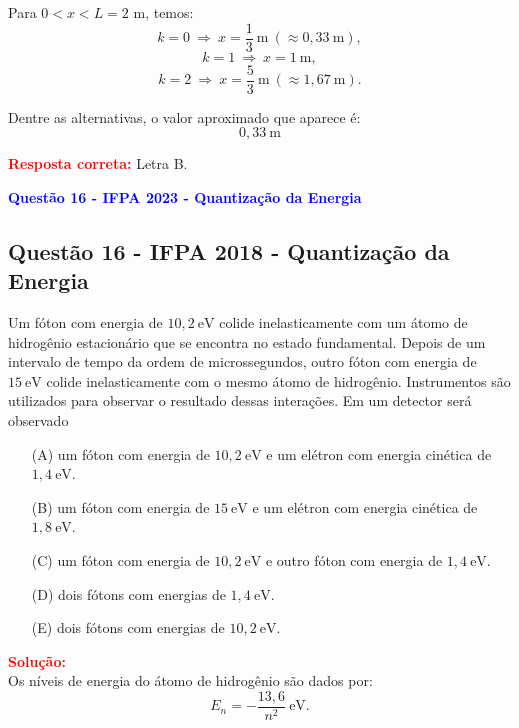 \begin{flushleft}
Para $0 < x < L = 2$ m, temos:
\[
k = 0 \ \Rightarrow \ x = \frac{1}{3} \ \text{m} \ (\approx 0,33 \ \text{m}),
\]
\[
k = 1 \ \Rightarrow \ x = 1 \ \text{m},
\]
\[
k = 2 \ \Rightarrow \ x = \frac{5}{3} \ \text{m} \ (\approx 1,67 \ \text{m}).
\]

Dentre as alternativas, o valor aproximado que aparece é:
\[
\boxed{0,33 \ \text{m}}
\]

\textcolor{red}{\textbf{Resposta correta:}} Letra B.

\end{flushleft}

\begin{flushleft}
\textbf{\textcolor{blue}{\Large Quest\~ao 16 - IFPA 2023 - Quantiza\c{c}\~ao da Energia}}\\
\noindent

\subsection{Quest\~ao 16 - IFPA 2018 - Quantiza\c{c}\~ao da Energia}

Um fóton com energia de $10{,}2\ \mathrm{eV}$ colide inelasticamente com um átomo de hidrogênio estacionário que se encontra no estado fundamental. Depois de um intervalo de tempo da ordem de microssegundos, outro fóton com energia de $15\ \mathrm{eV}$ colide inelasticamente com o mesmo átomo de hidrogênio. Instrumentos são utilizados para observar o resultado dessas interações. Em um detector será observado

\begin{itemize}
\item[(A)] um fóton com energia de $10{,}2\ \mathrm{eV}$ e um elétron com energia cinética de $1{,}4\ \mathrm{eV}$.
\item[(B)] um fóton com energia de $15\ \mathrm{eV}$ e um elétron com energia cinética de $1{,}8\ \mathrm{eV}$.
\item[(C)] um fóton com energia de $10{,}2\ \mathrm{eV}$ e outro fóton com energia de $1{,}4\ \mathrm{eV}$.
\item[(D)] dois fótons com energias de $1{,}4\ \mathrm{eV}$.
\item[(E)] dois fótons com energias de $10{,}2\ \mathrm{eV}$.
\end{itemize}

\vspace{0.5cm}

\textcolor{red}{\textbf{Solução:}}\\

Os níveis de energia do átomo de hidrogênio são dados por:
\[
E_n=-\frac{13{,}6}{n^2}\ \mathrm{eV}.
\]


\end{flushleft}
